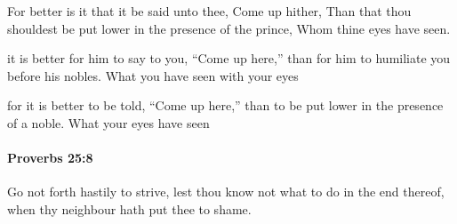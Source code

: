 			\begin{versebox}
					\item[BHS] 
					\item[ASV] For better is it that it be said unto thee, Come up hither, Than that thou shouldest be put lower in the presence of the prince, Whom thine eyes have seen.
					\item[NIV] it is better for him to say to you, “Come up here,” than for him to humiliate you before his nobles. What you have seen with your eyes
					\item[NRSV] for it is better to be told, “Come up here,” than to be put lower in the presence of a noble. What your eyes have seen
			\end{versebox}

		\paragraph{Proverbs 25:8} %
			\label{PROVERBS-25-8}

			Go not forth hastily to strive, lest thou know not what to do in the end thereof, when thy neighbour hath put thee to shame.


